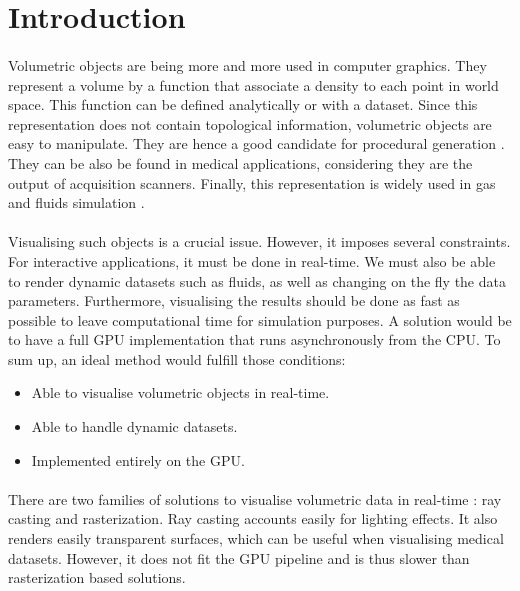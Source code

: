 \section{Introduction} 

\paragraph{} %
Volumetric objects are being more and more used in computer graphics.
They represent a volume by a function that associate a density to each point in world space.
This function can be defined analytically or with a dataset.
Since this representation does not contain topological information, volumetric objects are easy to manipulate.
They are hence a good candidate for procedural generation \cite{peytavie2009arches}.
They can be also be found in medical applications, considering they are the output of acquisition scanners.
Finally, this representation is widely used in gas and fluids simulation \cite{bridson2007fluid}.


\paragraph{} %
Visualising such objects is a crucial issue.
However, it imposes several constraints.
For interactive applications, it must be done in real-time.
We must also be able to render dynamic datasets such as fluids, as well as changing on the fly the data parameters.
Furthermore, visualising the results should be done as fast as possible to leave computational time for simulation purposes.
A solution would be to have a full GPU implementation that runs asynchronously from the CPU.
To sum up, an ideal method would fulfill those conditions:
\begin{itemize}
	\item Able to visualise volumetric objects in real-time.
	\item Able to handle dynamic datasets.
	\item Implemented entirely on the GPU.
\end{itemize}

\paragraph{}
There are two families of solutions to visualise volumetric data in real-time : ray casting and rasterization.
Ray casting  \cite{hadwiger2005real} accounts easily for lighting effects.
It also renders easily transparent surfaces, which can be useful when visualising medical datasets.
However, it does not fit the GPU pipeline and is thus slower than rasterization based solutions.

